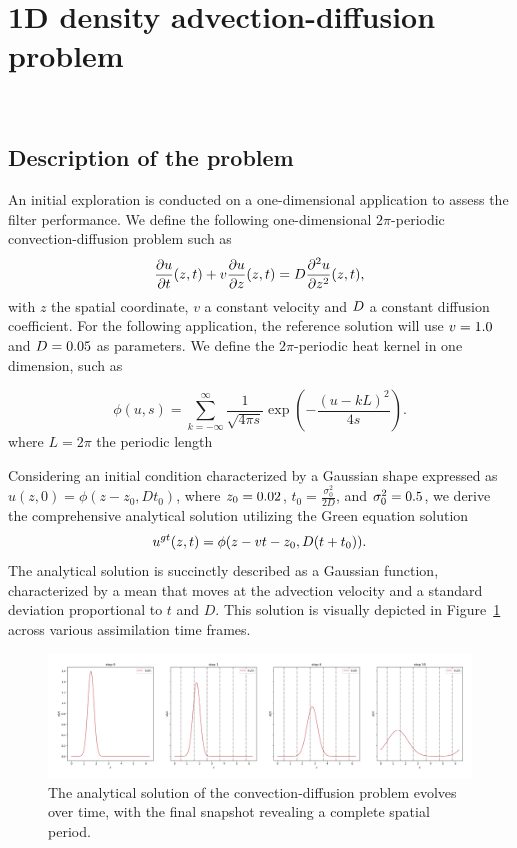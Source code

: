 \newpage

\section{1D density advection-diffusion problem}~\label{App_1D}
\subsection{Description of the problem}

An initial exploration is conducted on a one-dimensional application to assess the filter performance. We define the following one-dimensional $2\pi$-periodic convection-diffusion problem such as
\begin{equation*}
	\frac{\partial u}{\partial t}(z,t) + v \frac{\partial u}{\partial z}(z,t)  = D \frac{\partial^2 u}{\partial z^2}(z,t),
\end{equation*}
with $z$ the spatial coordinate, $v$ a constant velocity and $D$ a constant diffusion coefficient.
For the following application, the reference solution will use $v = 1.0$ and $D = 0.05$ as parameters.
We define the $2\pi$-periodic heat kernel in one dimension, such as

\begin{equation*}
	\phi(u, s) = \sum_{k=-\infty}^{\infty} \frac{1}{\sqrt{4 \pi s}} \exp{\left(-\frac{{(u - kL)}^2}{4s} \right)}.
\end{equation*}where $L=2\pi$ the periodic length

Considering an initial condition characterized by a Gaussian shape expressed as $u(z, 0) = \phi(z-z_0, Dt_0)$, where $z_0 = 0.02$, $t_0 = \frac{\sigma_0^2}{2D}$, and $\sigma_0^2 = 0.5$, we derive the comprehensive analytical solution utilizing the Green equation solution
\begin{equation*}
	u^{gt}(z, t) = \phi(z- v t - z_0, D (t+t_0)).
\end{equation*}The analytical solution is succinctly described as a Gaussian function, characterized by a mean that moves at the advection velocity and a standard deviation proportional to $t$ and $D$. This solution is visually depicted in Figure~\ref{fig:1d_analytical} across various assimilation time frames.

\begin{figure}[ht]
	\centering
	\includegraphics[width=\linewidth]{images/app1d/analytical_solution.png}
	\caption{The analytical solution of the convection-diffusion problem evolves over time, with the final snapshot revealing a complete spatial period.}
	\label{fig:1d_analytical}
\end{figure}

